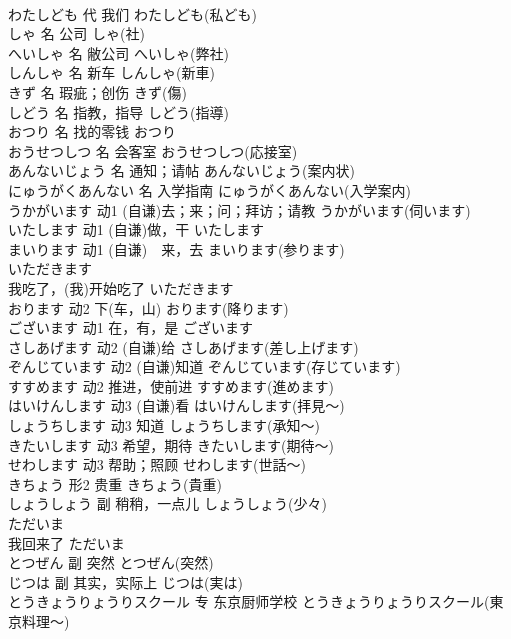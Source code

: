 \documentclass[8pt]{extreport}
\begin{document}
\begin{CJK}{UTF8}{min}
\\	わたしども	代	我们	わたしども(私ども)	
\\	しゃ	名	公司	しゃ(社)	
\\	へいしゃ	名	敝公司	へいしゃ(弊社)	
\\	しんしゃ	名	新车	しんしゃ(新車)	
\\	きず	名	瑕疵；创伤	きず(傷)	
\\	しどう	名	指教，指导	しどう(指導)	
\\	おつり	名	找的零钱	おつり	
\\	おうせつしつ	名	会客室	おうせつしつ(応接室)	
\\	あんないじょう	名	通知；请帖	あんないじょう(案内状)	
\\	にゅうがくあんない	名	入学指南	にゅうがくあんない(入学案内)	
\\	うかがいます	动1	(自谦)去；来；问；拜访；请教	うかがいます(伺います)	
\\	いたします	动1	(自谦)做，干	いたします	
\\	まいります	动1	(自谦)　来，去	まいります(参ります)	
\\	いただきます	
\\	我吃了，(我)开始吃了	いただきます	
\\	おります	动2	下(车，山)	おります(降ります)	
\\	ございます	动1	在，有，是	ございます	
\\	さしあげます	动2	(自谦)给	さしあげます(差し上げます)	
\\	ぞんじています	动2	(自谦)知道	ぞんじています(存じています)	
\\	すすめます	动2	推进，使前进	すすめます(進めます)	
\\	はいけんします	动3	(自谦)看	はいけんします(拝見～)	
\\	しょうちします	动3	知道	しょうちします(承知～)	
\\	きたいします	动3	希望，期待	きたいします(期待～)	
\\	せわします	动3	帮助；照顾	せわします(世話～)	
\\	きちょう	形2	贵重	きちょう(貴重)	
\\	しょうしょう	副	稍稍，一点儿	しょうしょう(少々)	
\\	ただいま	
\\	我回来了	ただいま	
\\	とつぜん	副	突然	とつぜん(突然)	
\\	じつは	副	其实，实际上	じつは(実は)	
\\	とうきょうりょうりスクール	专	东京厨师学校	とうきょうりょうりスクール(東京料理～)	

\end{CJK}
\end{document}
